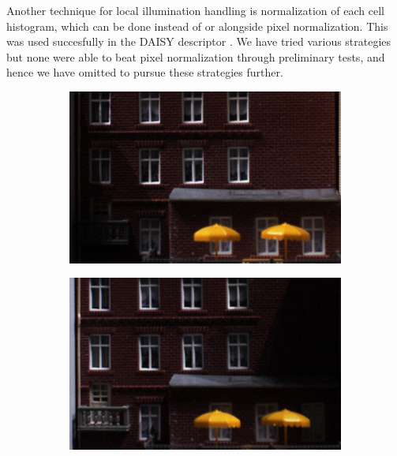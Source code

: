 \documentclass[thesis.tex]{subfiles}
\begin{document}
Another technique for local illumination handling is normalization of each cell histogram, which can be done instead of or alongside pixel normalization. This was used succesfully in the DAISY descriptor \cite{tola2008fast}. We have tried various strategies but none were able to beat pixel normalization through preliminary tests, and hence we have omitted to pursue these strategies further.
%
\begin{figure}[p]
    \centering
    \begin{subfigure}[t]{0.48\textwidth}
        \includegraphics[width=\textwidth]{img/pixelNormalizationExample1.png}
        \caption{}
        \label{fig:pixelNormalizationExample1}
    \end{subfigure}
    \begin{subfigure}[t]{0.48\textwidth}
        \includegraphics[width=\textwidth]{img/pixelNormalizationExample2.png}
        \caption{}
        \label{fig:pixelNormalizationExample2}
    \end{subfigure}

\end{figure}
\end{document}
